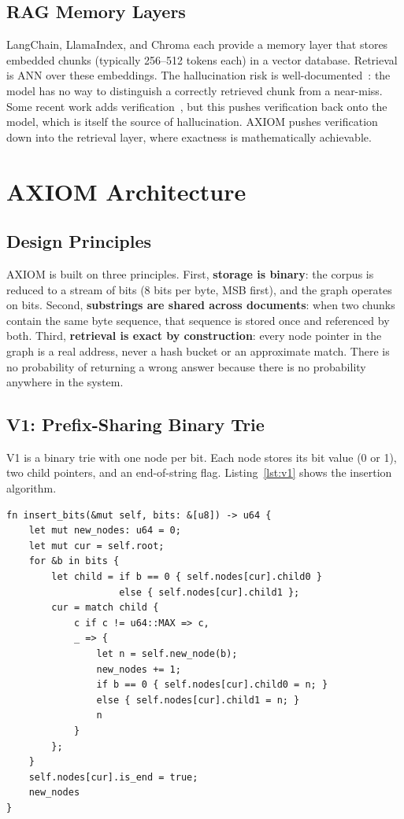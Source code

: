 \documentclass[conference]{IEEEtran}
\begin{document}
\subsection{RAG Memory Layers}

LangChain, LlamaIndex, and Chroma each provide a memory layer that stores embedded chunks (typically 256--512 tokens each) in a vector database. Retrieval is ANN over these embeddings. The hallucination risk is well-documented~\cite{ji2023hallucination}: the model has no way to distinguish a correctly retrieved chunk from a near-miss. Some recent work adds verification~\cite{gao2023rag}, but this pushes verification back onto the model, which is itself the source of hallucination. AXIOM pushes verification down into the retrieval layer, where exactness is mathematically achievable.

\section{AXIOM Architecture}

\subsection{Design Principles}

AXIOM is built on three principles. First, \textbf{storage is binary}: the corpus is reduced to a stream of bits (8 bits per byte, MSB first), and the graph operates on bits. Second, \textbf{substrings are shared across documents}: when two chunks contain the same byte sequence, that sequence is stored once and referenced by both. Third, \textbf{retrieval is exact by construction}: every node pointer in the graph is a real address, never a hash bucket or an approximate match. There is no probability of returning a wrong answer because there is no probability anywhere in the system.

\subsection{V1: Prefix-Sharing Binary Trie}

V1 is a binary trie with one node per bit. Each node stores its bit value (0 or 1), two child pointers, and an end-of-string flag. Listing~\ref{lst:v1} shows the insertion algorithm.

\begin{lstlisting}[caption={V1 prefix-trie insertion.},label={lst:v1}]
fn insert_bits(&mut self, bits: &[u8]) -> u64 {
    let mut new_nodes: u64 = 0;
    let mut cur = self.root;
    for &b in bits {
        let child = if b == 0 { self.nodes[cur].child0 }
                    else { self.nodes[cur].child1 };
        cur = match child {
            c if c != u64::MAX => c,
            _ => {
                let n = self.new_node(b);
                new_nodes += 1;
                if b == 0 { self.nodes[cur].child0 = n; }
                else { self.nodes[cur].child1 = n; }
                n
            }
        };
    }
    self.nodes[cur].is_end = true;
    new_nodes
}
\end{lstlisting}
\end{document}
